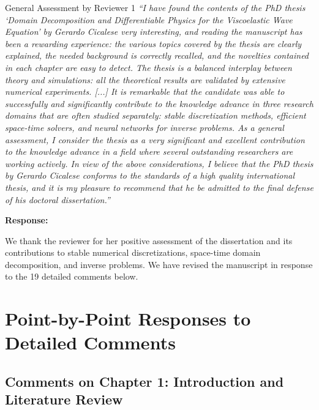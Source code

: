 \documentclass[11pt,a4paper]{article}
\newenvironment{response}{
    \par\vspace{1mm}\noindent\textbf{\textcolor{responseframe}{Response:}}\par\vspace{1mm}
}{
    \par\vspace{3mm}
}
\begin{document}
\begin{revcomment}{General Assessment by Reviewer 1}
\emph{``I have found the contents of the PhD thesis `Domain Decomposition and Differentiable Physics for the Viscoelastic Wave Equation' by Gerardo Cicalese very interesting, and reading the manuscript has been a rewarding experience: the various topics covered by the thesis are clearly explained, the needed background is correctly recalled, and the novelties contained in each chapter are easy to detect. The thesis is a balanced interplay between theory and simulations: all the theoretical results are validated by extensive numerical experiments. [...] It is remarkable that the candidate was able to successfully and significantly contribute to the knowledge advance in three research domains that are often studied separately: stable discretization methods, efficient space-time solvers, and neural networks for inverse problems. As a general assessment, I consider the thesis as a very significant and excellent contribution to the knowledge advance in a field where several outstanding researchers are working actively. In view of the above considerations, I believe that the PhD thesis by Gerardo Cicalese conforms to the standards of a high quality international thesis, and it is my pleasure to recommend that he be admitted to the final defense of his doctoral dissertation.''}
\end{revcomment}

\begin{response}
We thank the reviewer for her positive assessment of the dissertation and its contributions to stable numerical discretizations, space-time domain decomposition, and inverse problems. We have revised the manuscript in response to the 19 detailed comments below.
\end{response}

\newpage
\section{Point-by-Point Responses to Detailed Comments}

\subsection{Comments on Chapter 1: Introduction and Literature Review}
\end{document}
